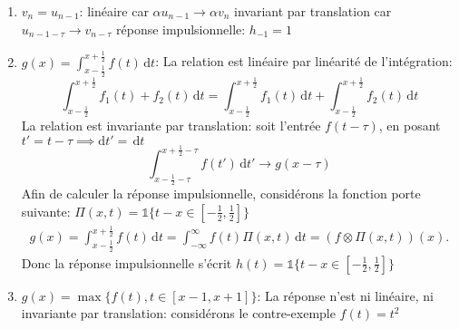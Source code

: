 \documentclass[12pt]{article}
\begin{document}
\begin{enumerate}
\item $v_n = u_{n-1}$: \newline
linéaire car $\alpha u_{n-1} \rightarrow \alpha v_n$ \newline
invariant par translation car $u_{n-1-\tau} \rightarrow v_{n-\tau}$ \newline
réponse impulsionnelle: $h_{-1} = 1$
\item $g(x) = \int_{x-\frac{1}{2}}^{x+\frac{1}{2}} f(t) \,\mathrm{d}t$: \newline
La relation est linéaire par linéarité de l'intégration: $$\int_{x-\frac{1}{2}}^{x+\frac{1}{2}} f_1(t) + f_2(t) \,\mathrm{d}t = \int_{x-\frac{1}{2}}^{x+\frac{1}{2}} f_1(t) \,\mathrm{d}t+ \int_{x-\frac{1}{2}}^{x+\frac{1}{2}} f_2(t) \,\mathrm{d}t$$ \newline
La relation est invariante par translation: soit l'entrée $f(t-\tau)$, \newline en posant $t' = t -\tau \implies \mathrm{d}t' = \,\mathrm{d}t $ $$\int_{x-\frac{1}{2}-\tau}^{x+\frac{1}{2}-\tau} f(t')\,\mathrm{d}t' \rightarrow g(x-\tau)$$
Afin de calculer la réponse impulsionnelle, considérons la fonction porte suivante: $\Pi(x, t) = \mathds{1}\{t-x \in {[{-\frac{1}{2}}, \frac{1}{2}]}\}$ \newline
\begin{equation*}\begin{split}
g(x) = \int_{x-\frac{1}{2}}^{x+\frac{1}{2}} f(t) \,\mathrm{d}t = \int_{-\infty}^{\infty} f(t) \Pi(x, t) \,\mathrm{d}t = (f \otimes \Pi(x, t))(x).
\end{split}\end{equation*}
Donc la réponse impulsionnelle s'écrit $h(t) = \mathds{1}\{t-x \in {[{-\frac{1}{2}}, \frac{1}{2}]}\}$
\item $g(x) = \max\{f(t), t \in {[x-1, x+1]}\}$: \newline
La réponse n'est ni linéaire, ni invariante par translation: considérons le contre-exemple $f(t) = t^2$ \newline

\end{enumerate}
\end{document}
